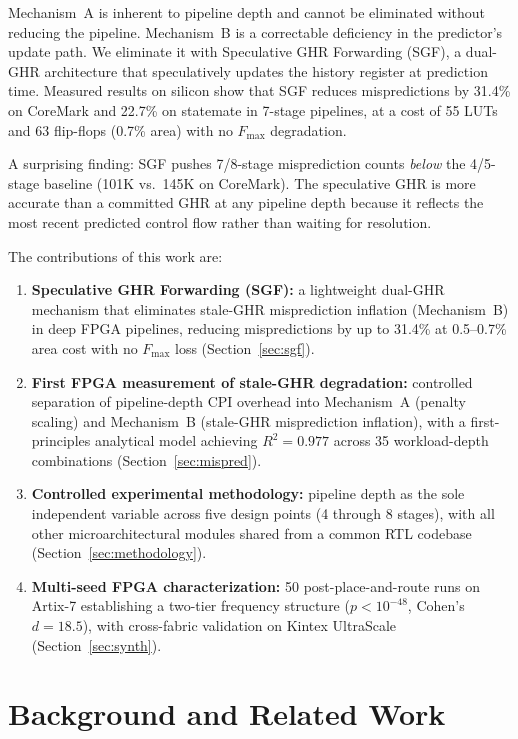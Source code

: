 \documentclass[journal]{IEEEtran}
\begin{document}
Mechanism~A is inherent to pipeline depth and cannot be eliminated without reducing the pipeline. Mechanism~B is a correctable deficiency in the predictor's update path. We eliminate it with Speculative GHR Forwarding (SGF), a dual-GHR architecture that speculatively updates the history register at prediction time. Measured results on silicon show that SGF reduces mispredictions by 31.4\% on CoreMark and 22.7\% on statemate in 7-stage pipelines, at a cost of 55 LUTs and 63 flip-flops (0.7\% area) with no $F_{\max}$ degradation.

A surprising finding: SGF pushes 7/8-stage misprediction counts \emph{below} the 4/5-stage baseline (101K vs.\ 145K on CoreMark). The speculative GHR is more accurate than a committed GHR at any pipeline depth because it reflects the most recent predicted control flow rather than waiting for resolution.

The contributions of this work are:
\begin{enumerate}
    \item \textbf{Speculative GHR Forwarding (SGF):} a lightweight dual-GHR mechanism that eliminates stale-GHR misprediction inflation (Mechanism~B) in deep FPGA pipelines, reducing mispredictions by up to 31.4\% at 0.5--0.7\% area cost with no $F_{\max}$ loss (Section~\ref{sec:sgf}).
    \item \textbf{First FPGA measurement of stale-GHR degradation:} controlled separation of pipeline-depth CPI overhead into Mechanism~A (penalty scaling) and Mechanism~B (stale-GHR misprediction inflation), with a first-principles analytical model achieving $R^2 = 0.977$ across 35 workload-depth combinations (Section~\ref{sec:mispred}).
    \item \textbf{Controlled experimental methodology:} pipeline depth as the sole independent variable across five design points (4 through 8 stages), with all other microarchitectural modules shared from a common RTL codebase (Section~\ref{sec:methodology}).
    \item \textbf{Multi-seed FPGA characterization:} 50 post-place-and-route runs on Artix-7 establishing a two-tier frequency structure ($p < 10^{-48}$, Cohen's $d = 18.5$), with cross-fabric validation on Kintex UltraScale (Section~\ref{sec:synth}).
\end{enumerate}

\section{Background and Related Work}
\end{document}
